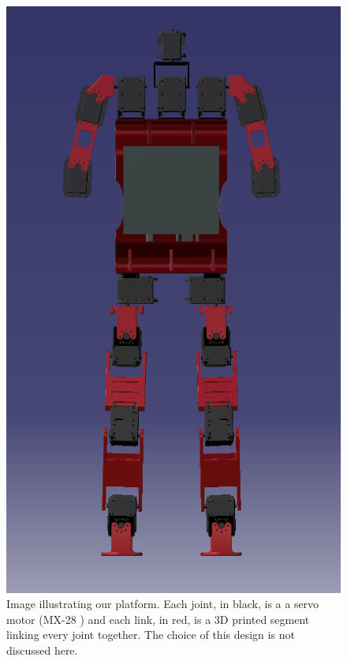 \documentclass[12pt,a4paper]{report}
\begin{document}
\begin{figure}[h]
  \begin{minipage}[c]{0.3\textwidth}
    \includegraphics[width=\textwidth]{figs/platform.png}
  \end{minipage}\hfill
  \begin{minipage}[c]{0.6\textwidth}
    \caption{Image illustrating our platform. Each joint, in black, is a a servo motor (MX-28 \cite{MX28}) and each link, in red, is a 3D printed segment linking every joint together. The choice of this design is not discussed here.}
    \label{fig:platform}
  \end{minipage}
\end{figure}
\end{document}
